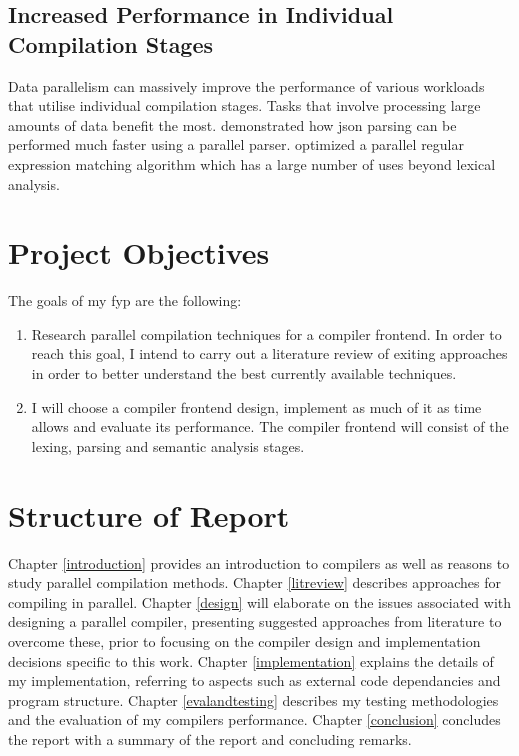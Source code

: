 \subsection{Increased Performance in Individual Compilation Stages}

Data parallelism can massively improve the performance of various workloads
that utilise individual compilation stages. Tasks that involve processing large
amounts of data benefit the most. \cite{barenghi_parallel_2015} demonstrated
how \gls{json} parsing can be performed much faster using a parallel parser.
\cite{mytkowicz_data-parallel_2014} optimized a parallel regular expression
matching algorithm which has a large number of uses beyond lexical analysis.

\section{Project Objectives}

The goals of my \gls{fyp} are the following: 

\begin{enumerate}
\item Research parallel compilation techniques for a compiler frontend. In order to reach this goal, I intend to carry out a literature review of exiting approaches in order to better understand the best currently available techniques. 
\item I will choose a compiler frontend design, implement as much of it as time allows and evaluate
its performance. The compiler frontend will consist of the lexing, parsing and
semantic analysis stages.
\end{enumerate}

\section{Structure of Report} \label{structure_of_report}

Chapter \ref{introduction} provides an introduction to compilers as well as
reasons to study parallel compilation methods.
\newline \newline
Chapter \ref{litreview} describes approaches for compiling
in parallel.
\newline \newline
Chapter \ref{design} will elaborate on the issues associated with designing a
parallel compiler, presenting suggested approaches from literature to overcome
these, prior to focusing on the compiler design and implementation decisions
specific to this work.
\newline \newline
Chapter \ref{implementation} explains the details of my implementation,
referring to aspects such as external code dependancies and program structure.
\newline \newline
Chapter \ref{evalandtesting} describes my testing methodologies and the
evaluation of my compilers performance.
\newline \newline
Chapter \ref{conclusion} concludes the report with a summary of the report and
concluding remarks.
